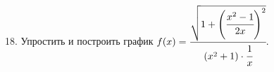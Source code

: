 18. Упростить и построить график $f(x)=\cfrac{\sqrt{1+\left(\cfrac{x^2-1}{2x}\right)^2}}{(x^2+1)\cdot\cfrac{1}{x}}.$\\
